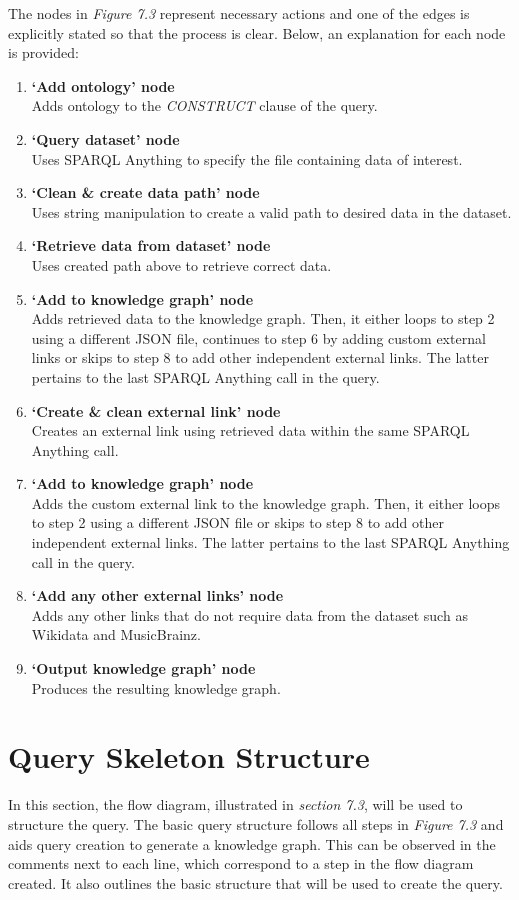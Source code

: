 The nodes in \textit{Figure 7.3} represent necessary actions and one of the edges is explicitly stated so that the process is clear. Below, an explanation for each node is provided: 

\begin{enumerate}
  \item \textbf{`Add ontology' node} \\ Adds ontology to the \textit{CONSTRUCT} clause of the query.
  \item \textbf{`Query dataset' node} \\ Uses SPARQL Anything to specify the file containing data of interest.
  \item \textbf{`Clean \& create data path' node} \\ Uses string manipulation to create a valid path to desired data in the dataset. 
  \item \textbf{`Retrieve data from dataset' node} \\ Uses created path above to retrieve correct data.
  \item \textbf{`Add to knowledge graph' node} \\ Adds retrieved data to the knowledge graph. Then, it either loops to step 2 using a different JSON file, continues to step 6 by adding custom external links or skips to step 8 to add other independent external links. The latter pertains to the last SPARQL Anything call in the query. 
  \item \textbf{`Create \& clean external link' node} \\ Creates an external link using retrieved data within the same SPARQL Anything call.
  \item \textbf{`Add to knowledge graph' node} \\ Adds the custom external link to the knowledge graph. Then, it either loops to step 2 using a different JSON file or skips to step 8 to add other independent external links. The latter pertains to the last SPARQL Anything call in the query. 
  \item \textbf{`Add any other external links' node} \\ Adds any other links that do not require data from the dataset such as Wikidata and MusicBrainz.
  \item \textbf{`Output knowledge graph' node} \\ Produces the resulting knowledge graph.
\end{enumerate}

\section{Query Skeleton Structure}
\hspace{0.5cm} In this section, the flow diagram, illustrated in \textit{section 7.3}, will be used to structure the query. The basic query structure follows all steps in \textit{Figure 7.3} and aids query creation to generate a knowledge graph. This can be observed in the comments next to each line, which correspond to a step in the flow diagram created. It also outlines the basic structure that will be used to create the query.

